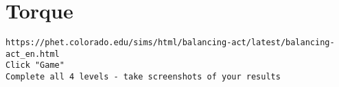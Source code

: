 \section{Torque}

\begin{verbatim}
https://phet.colorado.edu/sims/html/balancing-act/latest/balancing-act_en.html
Click "Game"
Complete all 4 levels - take screenshots of your results
\end{verbatim}

\pagebreak \clearpage
